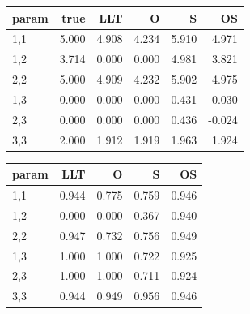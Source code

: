 \documentclass[
]{article}
\begin{document}
\begin{longtable}[t]{l|r|r|r|r|r}
\hline
param & true & LLT & O & S & OS\\
\hline
1,1 & 5.000 & 4.908 & 4.234 & 5.910 & 4.971\\
\hline
1,2 & 3.714 & 0.000 & 0.000 & 4.981 & 3.821\\
\hline
2,2 & 5.000 & 4.909 & 4.232 & 5.902 & 4.975\\
\hline
1,3 & 0.000 & 0.000 & 0.000 & 0.431 & -0.030\\
\hline
2,3 & 0.000 & 0.000 & 0.000 & 0.436 & -0.024\\
\hline
3,3 & 2.000 & 1.912 & 1.919 & 1.963 & 1.924\\
\hline
\end{longtable}

\begin{longtable}[t]{l|r|r|r|r}
\hline
param & LLT & O & S & OS\\
\hline
1,1 & 0.944 & 0.775 & 0.759 & 0.946\\
\hline
1,2 & 0.000 & 0.000 & 0.367 & 0.940\\
\hline
2,2 & 0.947 & 0.732 & 0.756 & 0.949\\
\hline
1,3 & 1.000 & 1.000 & 0.722 & 0.925\\
\hline
2,3 & 1.000 & 1.000 & 0.711 & 0.924\\
\hline
3,3 & 0.944 & 0.949 & 0.956 & 0.946\\
\hline
\end{longtable}
\end{document}
